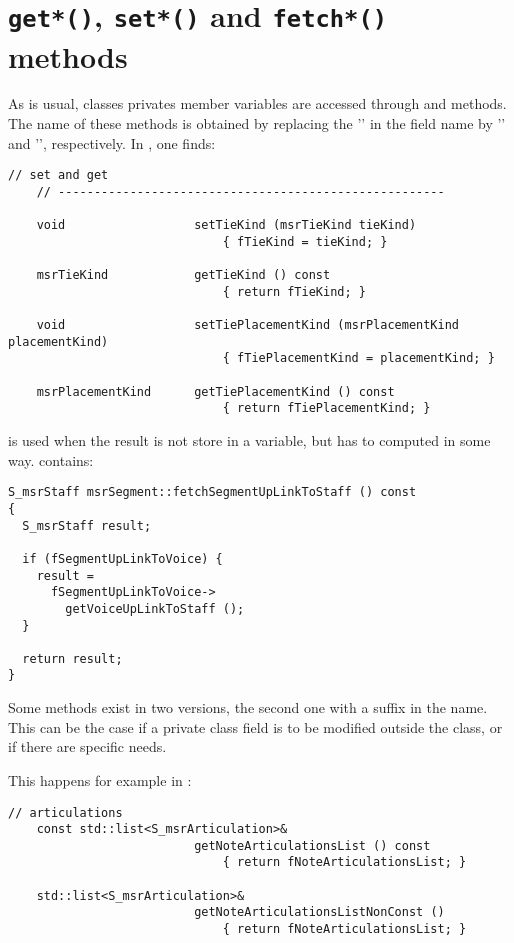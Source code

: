 \section{{\tt get*()}, {\tt set*()} and {\tt fetch*()} methods}

As is usual, classes privates member variables are accessed through  and  methods. The name of these methods is obtained by replacing the '' in the field name by '' and '', respectively. In , one finds:
\begin{lstlisting}[language=CPlusPlus]
    // set and get
    // ------------------------------------------------------

    void                  setTieKind (msrTieKind tieKind)
                              { fTieKind = tieKind; }

    msrTieKind            getTieKind () const
                              { return fTieKind; }

    void                  setTiePlacementKind (msrPlacementKind placementKind)
                              { fTiePlacementKind = placementKind; }

    msrPlacementKind      getTiePlacementKind () const
                              { return fTiePlacementKind; }
\end{lstlisting}


 is used when the result is not store in a variable, but has to computed in some way.  contains:
\begin{lstlisting}[language=CPlusPlus]
S_msrStaff msrSegment::fetchSegmentUpLinkToStaff () const
{
  S_msrStaff result;

  if (fSegmentUpLinkToVoice) {
    result =
      fSegmentUpLinkToVoice->
        getVoiceUpLinkToStaff ();
  }

  return result;
}
\end{lstlisting}

Some methods exist in two versions, the second one with a  suffix in the name. This can be the case if a private class   field is to be modified outside the class, or if there are specific needs.

This happens for example in :
\begin{lstlisting}[language=CPlusPlus]
    // articulations
    const std::list<S_msrArticulation>&
                          getNoteArticulationsList () const
                              { return fNoteArticulationsList; }

    std::list<S_msrArticulation>&
                          getNoteArticulationsListNonConst ()
                              { return fNoteArticulationsList; }
\end{lstlisting}

